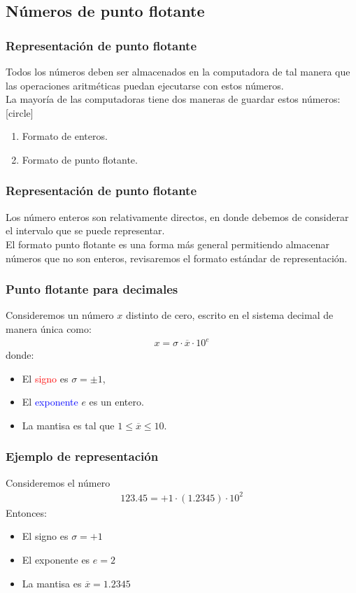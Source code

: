 \subsection{Números de punto flotante}
\begin{frame}
\frametitle{Representación de punto flotante}
Todos los números deben ser almacenados en la computadora de tal manera que las operaciones aritméticas puedan ejecutarse  con estos números.
\\
\bigskip
\pause
La mayoría de las computadoras tiene dos maneras de guardar estos números:
[circle]
\begin{enumerate}[<+->]
\item Formato de enteros.
\item Formato de punto flotante.
\end{enumerate}
\end{frame}
\begin{frame}
\frametitle{Representación de punto flotante}
Los número enteros son relativamente directos, en donde debemos de considerar el intervalo que se puede representar.
\\
\bigskip
\pause
El formato punto flotante es una forma más general permitiendo almacenar números que no son enteros, revisaremos el formato estándar de representación.
\end{frame}
\begin{frame}
\frametitle{Punto flotante para decimales}
Consideremos un número $x$ distinto de cero, escrito en el sistema decimal de manera única como:
\begin{align*}
x =  \sigma \cdot \overline{x} \cdot 10^{e}
\end{align*}
\pause
donde: 
\begin{itemize}
\item El \textcolor{red}{signo} es $\sigma= \pm 1$,
\item El \textcolor{blue}{exponente} $e$ es un entero.
\item La \textcolor{ao}{mantisa} es tal que $ 1 \leq \overline{x} \leq 10$.
\end{itemize}
\end{frame}
\begin{frame}
\frametitle{Ejemplo de representación}
Consideremos el número
\begin{align*}
123.45 = +1 \cdot (1.2345) \cdot 10^{2}
\end{align*}
\pause
Entonces:
\begin{itemize}
\item El signo es $\sigma = +1$
\item El exponente es $e = 2$
\item La mantisa es $\overline{x} =1.2345$
\end{itemize}
\end{frame}

